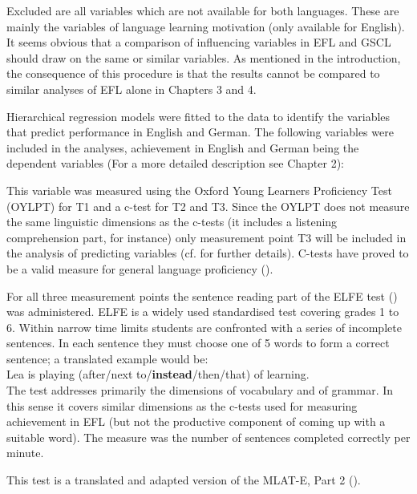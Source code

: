 \documentclass[output=paper]{langsci/langscibook}
\begin{document}
Excluded are all variables which are not available for both languages. These are mainly the variables of language learning motivation (only available for English). It seems obvious that a comparison of influencing variables in EFL and GSCL should draw on the same or similar variables. As mentioned in the introduction, the consequence of this procedure is that the results cannot be compared to similar analyses of EFL alone in Chapters 3 and 4.

Hierarchical regression models were fitted to the data to identify the variables that predict performance in English and German. The following variables were included in the analyses, achievement in English and German being the dependent variables (For a more detailed description see Chapter 2):

\begin{description}\sloppy
\item[Achievement in English as a foreign language (EFL):]
This variable was measured using the Oxford Young Learners Proficiency Test (OYLPT) for T1 and a c-test for T2 and T3. Since the OYLPT does not measure the same linguistic dimensions as the c-tests (it includes a listening comprehension part, for instance) only measurement point T3 will be included in the analysis of predicting variables (cf.  for further details). C-tests have proved to be a valid measure for general language proficiency (\citealt{EckesGrotjahn2006}).
\item[Achievement in German as the school language (GSCL):]
For all three measurement points the sentence reading part of the ELFE test (\citealt{LenhardSchneider2006}) was administered. ELFE is a widely used standardised test covering grades 1 to 6. Within narrow time limits students are confronted with a series of incomplete sentences. In each sentence they must choose one of 5 words to form a correct sentence; a translated example would be:\\
Lea is playing (after\slash next to\slash\textbf{instead}\slash then\slash that) of learning. \\
The test addresses primarily the dimensions of vocabulary and of grammar. In this sense it covers similar dimensions as the c-tests used for measuring achievement in EFL (but not the productive component of coming up with a suitable word). The measure was the number of sentences completed correctly per minute.
\item[Grammatical sensitivity (MLAT, Part 2):]
This test is a translated and adapted version of the MLAT-E, Part 2 (\citealt{CarrollSapon2010}). 

\end{description}
\end{document}
